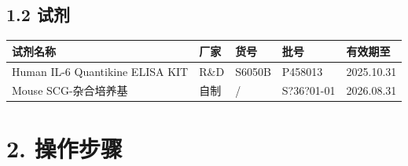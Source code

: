 \documentclass[UTF8,10pt,a4paper,fontset=fandol]{ctexart}
\newcommand{\fieldvalue}[1]{#1}
\newcommand{\handwritten}[1]{#1}
\begin{document}
\subsection*{1.2 试剂}

\begin{tabularx}{\textwidth}{|X|p{2.5cm}|p{2.5cm}|p{2.5cm}|}
\hline
试剂名称 & 厂家 & 货号 & 批号 & 有效期至 \\
\hline
Human IL-6 Quantikine ELISA KIT & R\&D & S6050B &
\fieldvalue{\handwritten{P458013}} &
\fieldvalue{\handwritten{2025.10.31}} \\
\hline
Mouse SCG-杂合培养基 & 自制 & / &
\fieldvalue{\handwritten{S?36?01-01}} &
\fieldvalue{\handwritten{2026.08.31}} \\
\hline
\end{tabularx}

\section*{2. 操作步骤}
\end{document}
